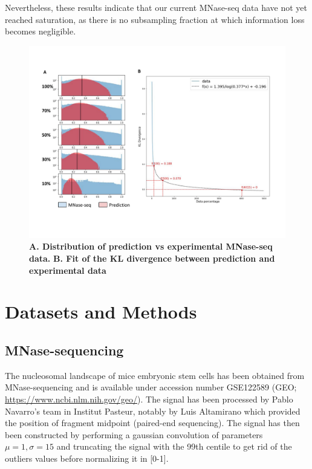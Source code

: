 \documentclass[11pt]{book}
\begin{document}
Nevertheless, these results indicate that our current MNase-seq data have not yet reached saturation, as there is no subsampling fraction at which information loss becomes negligible.

\begin{figure}[htbp]
    \centering
    \includegraphics[width=\textwidth]{Figures/Results/subsampling.pdf}
    \caption{\textbf{A. Distribution of prediction vs experimental MNase-seq data.} \textbf{B. Fit of the KL divergence between prediction and experimental data}}
    \label{fig:subsampling}
\end{figure}


\chapter{Datasets and Methods}
\label{appendix:methods_of_interpretation}

\section{MNase-sequencing}
The nucleosomal landscape of mice embryonic stem cells has been obtained from MNase-sequencing\cite{festuccia_transcription_2019} and is available under accession number GSE122589 (GEO; \url{https://www.ncbi.nlm.nih.gov/geo/}). The signal has been processed by Pablo Navarro's team in Institut Pasteur, notably by Luis Altamirano which provided the position of fragment midpoint (paired-end sequencing). The signal has then been constructed by performing a gaussian convolution of parameters $\mu=1, \sigma=15$ and truncating the signal with the 99th centile to get rid of the outliers values before normalizing it in [0-1].
\end{document}
